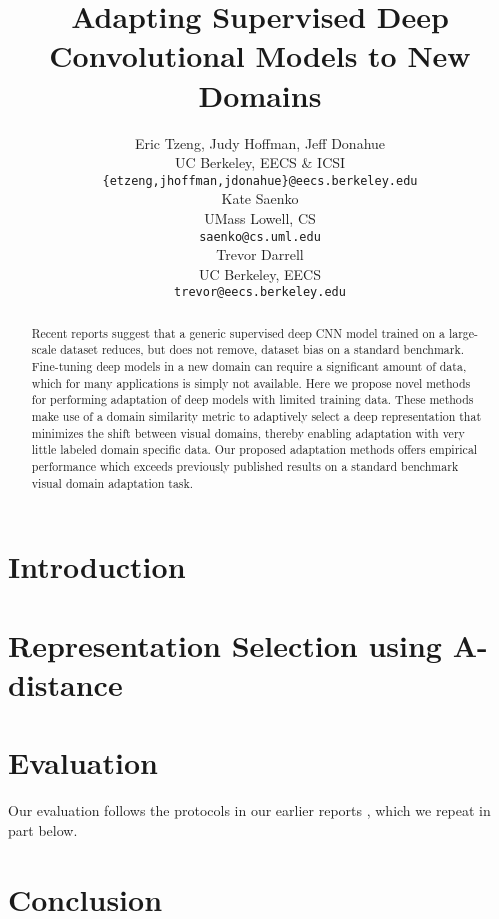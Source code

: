 \documentclass{article} %
\title{Adapting Supervised Deep Convolutional Models to New Domains}
\author{
Eric Tzeng, Judy Hoffman, Jeff Donahue \\
UC Berkeley, EECS \& ICSI\\
\footnotesize{\texttt{\{etzeng,jhoffman,jdonahue\}@eecs.berkeley.edu} }\\
\And
Kate Saenko \\
UMass Lowell, CS  \\
\footnotesize{\texttt{saenko@cs.uml.edu}} \\
\And
Trevor Darrell \\
UC Berkeley, EECS\\
\footnotesize{\texttt{trevor@eecs.berkeley.edu}} \\
}
\begin{document}
\maketitle

\begin{abstract}
Recent reports suggest that  a generic supervised deep CNN model trained on a large-scale dataset reduces, but does not remove, dataset bias on a standard benchmark. Fine-tuning deep models in a new domain can require a significant amount of data, which for many applications is simply not available. Here
we propose novel methods for performing adaptation of deep models with limited training data.
These methods make use of a domain similarity metric to adaptively select a deep representation that minimizes the shift between visual domains, thereby enabling adaptation with very little labeled domain specific data.
Our proposed adaptation methods offers empirical performance which exceeds previously published results on a standard benchmark visual domain adaptation task.

\end{abstract}

\section{Introduction}


%

\vspace{-.3cm}
\section{Representation Selection using A-distance}
\label{sec:adapt-algs}
\vspace{-.2cm}


\section{Evaluation}
Our evaluation follows the protocols in our earlier reports \cite{deeplearning-arxiv-2013,hoffman-iclr14}, which we repeat in part below.


\section{Conclusion}



\small{


}
\end{document}

